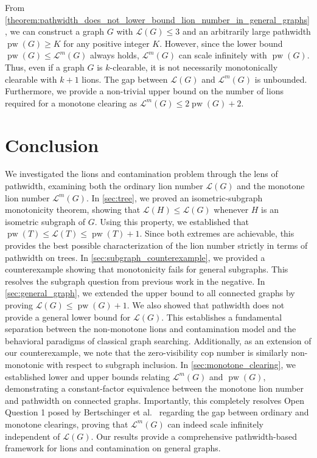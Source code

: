 \documentclass[a4paper,UKenglish,cleveref, autoref, thm-restate]{lipics-v2021}
\begin{document}
From \cref{theorem:pathwidth_does_not_lower_bound_lion_number_in_general_graphs}, we can construct a graph $G$ with $\mathcal{L}(G) \leq 3$ and an arbitrarily large pathwidth $\operatorname{pw}(G) \geq K$ for any positive integer $K$. However, since the lower bound $\operatorname{pw}(G) \leq \mathcal{L}^m(G)$ always holds, $\mathcal{L}^m(G)$ can scale infinitely with $\operatorname{pw}(G)$. Thus, even if a graph $G$ is $k$-clearable, it is not necessarily monotonically clearable with $k+1$ lions. The gap between $\mathcal{L}(G)$ and $\mathcal{L}^m(G)$ is unbounded.
Furthermore, we provide a non-trivial upper bound on the number of lions required for a monotone clearing as $\mathcal{L}^m(G) \leq 2\operatorname{pw}(G)+2$.

\section{Conclusion}

We investigated the lions and contamination problem through the lens of pathwidth, examining both the ordinary lion number $\mathcal{L}(G)$ and the monotone lion number $\mathcal{L}^m(G)$.
In \cref{sec:tree}, we proved an isometric-subgraph monotonicity theorem, showing that \(\mathcal{L}(H)\le \mathcal{L}(G)\) whenever \(H\) is an isometric subgraph of \(G\). Using this property, we established that \(\operatorname{pw}(T)\le \mathcal{L}(T)\le \operatorname{pw}(T)+1\). 
Since both extremes are achievable, this provides the best possible characterization of the lion number strictly in terms of pathwidth on trees.
In \cref{sec:subgraph_counterexample}, we provided a counterexample showing that monotonicity fails for general subgraphs. This resolves the subgraph question from previous work in the negative.
In \cref{sec:general_graph}, we extended the upper bound to all connected graphs by proving $\mathcal{L}(G)\le \operatorname{pw}(G)+1$.
We also showed that pathwidth does not provide a general lower bound for \(\mathcal{L}(G)\).
This establishes a fundamental separation between the non-monotone lions and contamination model and the behavioral paradigms of classical graph searching.
Additionally, as an extension of our counterexample, we note that the zero-visibility cop number is similarly non-monotonic with respect to subgraph inclusion.
In \cref{sec:monotone_clearing}, we established lower and upper bounds relating \(\mathcal{L}^m(G)\) and \(\operatorname{pw}(G)\), demonstrating a constant-factor equivalence between the monotone lion number and pathwidth on connected graphs. Importantly, this completely resolves Open Question 1 posed by Bertschinger et al.~\cite{Bertschinger23} regarding the gap between ordinary and monotone clearings, proving that $\mathcal{L}^m(G)$ can indeed scale infinitely independent of $\mathcal{L}(G)$. Our results provide a comprehensive pathwidth-based framework for lions and contamination on general graphs.
\end{document}
